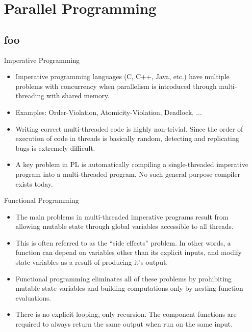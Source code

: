 \documentclass[serif,xcolor=pdftex,dvipsnames,table,hyperref={bookmarks=false,breaklinks}]{beamer}
\begin{document}
\section{Parallel Programming}
\subsection{foo}

\begin{frame}[t]{Imperative Programming}
\begin{itemize}
\item Imperative programming languages (C, C++, Java, etc.) have multiple 
problems with concurrency when parallelism is introduced through 
multi-threading with shared memory.

\pause \item Examples: Order-Violation, Atomicity-Violation, Deadlock, ... 

\pause \item Writing correct multi-threaded code is highly non-trivial. Since 
the order of execution of code in threads is basically random, detecting and
replicating bugs is extremely difficult.

\pause \item A key problem in PL is automatically compiling a single-threaded 
imperative program into a multi-threaded program. No such general purpose 
compiler exists today. 

\end{itemize}
\end{frame}


\begin{frame}[t]{Functional Programming}
\begin{itemize}
\item The main problems in multi-threaded imperative programs result from 
allowing mutable state through global variables accessible to all threads. 

\pause\item This is often referred to as the ``side effects'' problem. In other 
words, a function can depend on variables other than its explicit inputs, and 
modify state variables as a result of producing it's output. 

\pause \item Functional programming eliminates all of these problems by 
prohibiting mutable state variables and building computations only by nesting
function evaluations.

\pause \item There is no explicit looping, only recursion. The component 
functions are required to always return the same output when run on the same 
input.

\end{itemize}
\end{frame}
\end{document}
